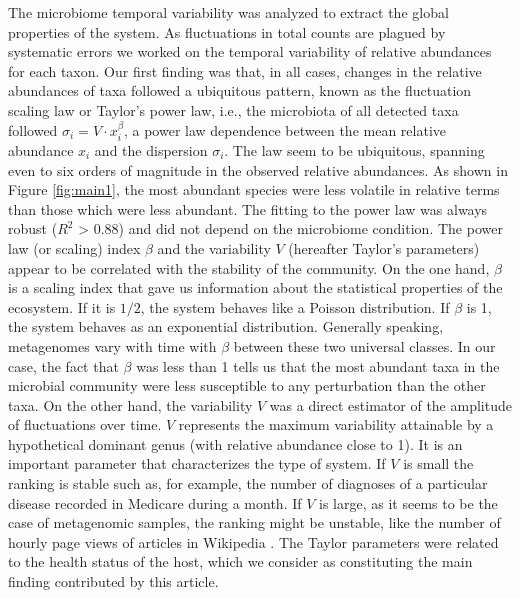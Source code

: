 
The microbiome temporal variability was analyzed to extract the global properties of the system. As fluctuations in total counts are plagued by systematic errors we worked on the temporal variability of relative abundances for each taxon. Our first finding was that, in all cases, changes in the relative abundances of taxa followed a ubiquitous pattern, known as the fluctuation scaling law\cite{fs} or Taylor's power law\cite{taylor}, i.e., the microbiota of all detected taxa followed $\sigma_i  = V\cdot x_i^{\beta}$, a power law dependence between the mean relative abundance $x_i$ and the dispersion $\sigma_i$. The law seem to be ubiquitous, spanning even to six orders of magnitude in the observed relative abundances. As shown in Figure \ref{fig:main1}, the most abundant species were less volatile in relative terms than those which were less abundant. The fitting to the power law was always robust ($R^{2}$ > 0.88) and did not depend on the microbiome condition. The power law (or scaling) index $\beta$ and the variability $V$ (hereafter Taylor's parameters) appear to be correlated with the stability of the community. On the one hand, $\beta$ is a scaling index that gave us information about the statistical properties of the ecosystem. If it is $1/2$, the system behaves like a Poisson distribution. If $\beta$ is 1, the system behaves as an exponential distribution. Generally speaking, metagenomes vary with time with $\beta$ between these two universal classes. In our case, the fact that $\beta$ was less than 1 tells us that the most abundant taxa in the microbial community were less susceptible to any perturbation than the other taxa. On the other hand, the variability $V$ was a direct estimator of the amplitude of fluctuations over time. $V$ represents the maximum variability attainable by a hypothetical dominant genus (with relative abundance close to 1). It is an important parameter that characterizes the type of system. If $V$ is small the ranking is stable such as, for example, the number of diagnoses of a particular disease recorded in Medicare during a month. If $V$ is large, as it seems to be the case of metagenomic samples, the ranking might be unstable, like the number of hourly page views of articles in Wikipedia \cite{ranking,fs}. The Taylor parameters were related to the health status of the host, which we consider as constituting the main finding contributed by this article.

